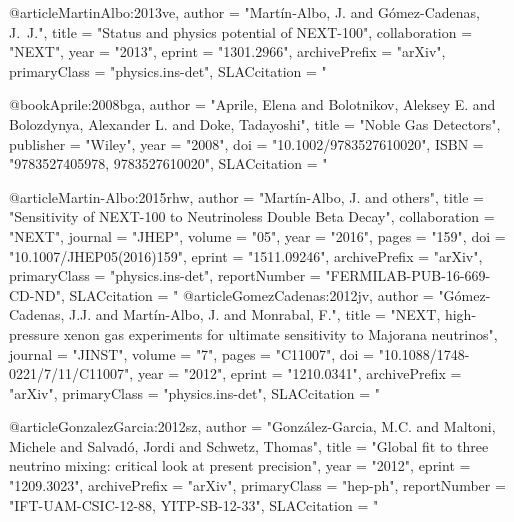 @article{MartinAlbo:2013ve,
      author         = "Mart\'in-Albo, J. and G\'omez-Cadenas, J.~J.",
      title          = "{Status and physics potential of NEXT-100}",
      collaboration  = "NEXT",
      year           = "2013",
      eprint         = "1301.2966",
      archivePrefix  = "arXiv",
      primaryClass   = "physics.ins-det",
      SLACcitation   = "%
}

@book{Aprile:2008bga,
      author         = "Aprile, Elena and Bolotnikov, Aleksey E. and Bolozdynya,
                        Alexander L. and Doke, Tadayoshi",
      title          = "{Noble Gas Detectors}",
      publisher      = "Wiley",
      year           = "2008",
      doi            = "10.1002/9783527610020",
      ISBN           = "9783527405978, 9783527610020",
      SLACcitation   = "%
}

@article{Martin-Albo:2015rhw,
      author         = "Mart\'in-Albo, J. and others",
      title          = "{Sensitivity of NEXT-100 to Neutrinoless Double Beta
                        Decay}",
      collaboration  = "NEXT",
      journal        = "JHEP",
      volume         = "05",
      year           = "2016",
      pages          = "159",
      doi            = "10.1007/JHEP05(2016)159",
      eprint         = "1511.09246",
      archivePrefix  = "arXiv",
      primaryClass   = "physics.ins-det",
      reportNumber   = "FERMILAB-PUB-16-669-CD-ND",
      SLACcitation   = "%
}
@article{GomezCadenas:2012jv,
      author         = "G\'omez-Cadenas, J.J. and Mart\'in-Albo, J. and Monrabal, F.",
      title          = "{NEXT, high-pressure xenon gas experiments for ultimate
                        sensitivity to Majorana neutrinos}",
      journal        = "JINST",
      volume         = "7",
      pages          = "C11007",
      doi            = "10.1088/1748-0221/7/11/C11007",
      year           = "2012",
      eprint         = "1210.0341",
      archivePrefix  = "arXiv",
      primaryClass   = "physics.ins-det",
      SLACcitation   = "%
}

@article{GonzalezGarcia:2012sz,
      author         = "Gonz\'alez-Garcia, M.C. and Maltoni, Michele and Salvad\'o,
                        Jordi and Schwetz, Thomas",
      title          = "{Global fit to three neutrino mixing: critical look at
                        present precision}",
      year           = "2012",
      eprint         = "1209.3023",
      archivePrefix  = "arXiv",
      primaryClass   = "hep-ph",
      reportNumber   = "IFT-UAM-CSIC-12-88, YITP-SB-12-33",
      SLACcitation   = "%
}


